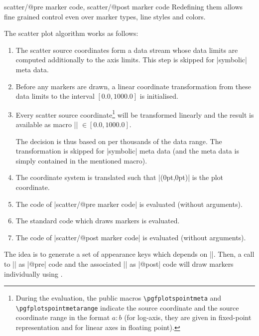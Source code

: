 {\begin{pgfplotsxycodekeylist}{%
    scatter/@pre marker code,
    scatter/@post marker code%
}
    Redefining them allows fine grained control even over marker types, line
    styles and colors.

    The scatter plot algorithm works as follows:
    \begin{enumerate}
        \item The scatter source coordinates form a data stream whose data
            limits are computed additionally to the axis limits. This step is
            skipped for |symbolic| meta data.
        \item Before any markers are drawn, a linear coordinate
            transformation from these data limits to the interval
            $[0.0,1000.0]$ is initialised.
        \item Every scatter source coordinate\footnote{During the evaluation,
            the public macros \texttt{\textbackslash pgfplotspointmeta} and
            \texttt{\textbackslash pgfplotspointmetarange} indicate the
            source coordinate and the source coordinate range in the format
            $a:b$ (for log-axis, they are given in fixed-point representation
            and for linear axes in floating point).} will be transformed
            linearly and the result is available as macro
            |\pgfplotspointmetatransformed| $ \in [0.0,1000.0]$.

            The decision is thus based on per thousands of the data range.
            The transformation is skipped for |symbolic| meta data (and the
            meta data is simply contained in the mentioned macro).
        \item The \pgfname{} coordinate system is translated such that
            |(0pt,0pt)| is the plot coordinate.
        \item The code of |scatter/@pre marker code| is evaluated (without
            arguments).
        \item The standard code which draws markers is evaluated.
        \item The code of |scatter/@post marker code| is evaluated (without
            arguments).
    \end{enumerate}
    The idea is to generate a set of appearance keys which depends on
    |\pgfplotspointmetatransformed|. Then, a call to |\scope| as |@pre| code and the associated |\endscope| as |@post| code will
    draw markers individually using .


\end{pgfplotsxycodekeylist}}
